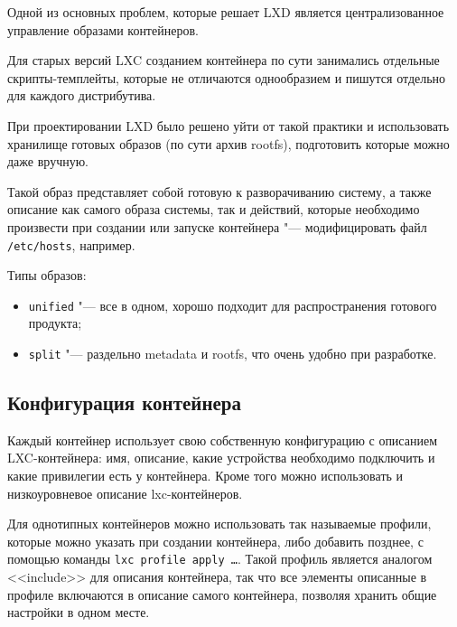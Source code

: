 \documentclass[10pt, a5paper]{article}
\begin{document}
Одной из основных проблем, которые решает {LXD} является 
централизованное управление образами контейнеров.

Для старых версий {LXC} созданием контейнера по сути занимались 
отдельные скрипты-темплейты, которые не отличаются однообразием и 
пишутся отдельно для каждого дистрибутива.

При проектировании {LXD} было решено уйти от такой практики и 
использовать хранилище готовых образов (по сути архив rootfs), 
подготовить которые можно даже вручную.

Такой образ представляет собой готовую к разворачиванию систему,
а также описание как самого образа системы, так и действий,
которые необходимо произвести при создании или запуске 
контейнера "--- модифицировать файл {\tt /etc/hosts}, например.

Типы образов:
\begin{itemize}
    \item {\tt unified} "--- все в одном, хорошо подходит 
        для распространения готового продукта;
    \item {\tt split} "--- раздельно metadata и rootfs, что очень 
        удобно при разработке.
\end{itemize}

\subsection*{Конфигурация контейнера}

Каждый контейнер использует свою собственную конфигурацию с описанием
{LXC}-контейнера: имя, описание, какие устройства необходимо подключить и
какие привилегии есть у контейнера. Кроме того можно использовать и низкоуровневое
описание lxc-контейнеров.

Для однотипных контейнеров можно использовать так называемые профили, которые можно
указать при создании контейнера, либо добавить позднее, с помощью команды 
{\tt lxc profile apply \ldots}. Такой профиль является аналогом <<include>> для описания 
контейнера, так что все элементы описанные в профиле включаются в описание 
самого контейнера, позволяя хранить общие настройки в одном месте.
\end{document}
